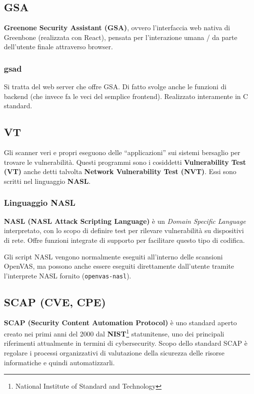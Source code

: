 \subsection{GSA}
\textbf{Greenone Security Assistant (GSA)}, ovvero l'interfaccia web nativa di Greenbone (realizzata con React), pensata per l'interazione umana / da parte dell'utente finale attraverso browser.

\subsubsection{gsad}
Si tratta del web server che offre GSA. Di fatto svolge anche le funzioni di backend (che invece fa le veci del semplice frontend). Realizzato interamente in C standard.

\subsection{VT}
Gli scanner veri e propri eseguono delle ``applicazioni'' sui sistemi bersaglio per trovare le vulnerabilità. Questi programmi sono i cosiddetti \textbf{Vulnerability Test (VT)} anche detti talvolta \textbf{Network Vulnerability Test (NVT)}. Essi sono scritti nel linguaggio \textbf{NASL}.

\subsubsection{Linguaggio NASL}
\textbf{NASL (NASL Attack Scripting Language)} è un \emph{Domain Specific Language} interpretato, con lo scopo di definire test per rilevare vulnerabilità su dispositivi di rete. Offre funzioni integrate di supporto per facilitare questo tipo di codifica.

Gli script NASL vengono normalmente eseguiti all'interno delle scansioni OpenVAS, ma possono anche essere eseguiti direttamente dall'utente tramite l'interprete NASL fornito (\texttt{openvas-nasl}).

\subsection{SCAP (CVE, CPE)}
\textbf{SCAP (Security Content Automation Protocol)} è uno standard aperto creato nei primi anni del 2000 dal \textbf{NIST}\footnote{National Institute of Standard and Technology} statunitense, uno dei principali riferimenti attualmente in termini di cybersecurity. Scopo dello standard SCAP è regolare i processi organizzativi di valutazione della sicurezza delle risorse informatiche e quindi automatizzarli.


